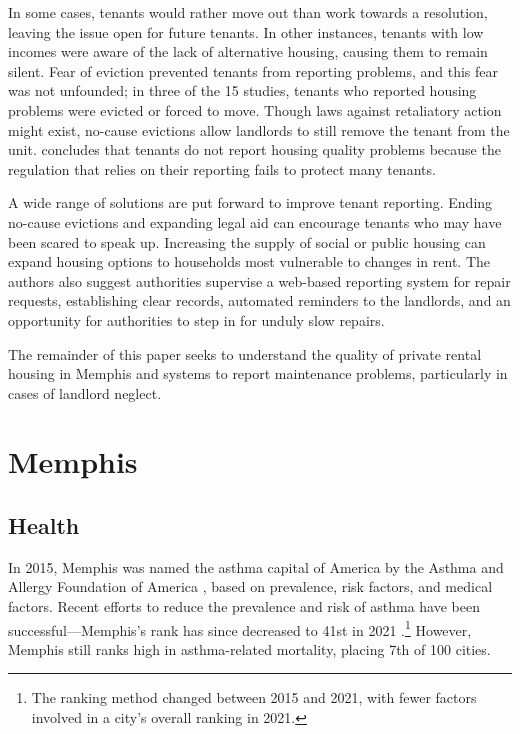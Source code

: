 \documentclass[
]{book}
\begin{document}
In some cases, tenants would rather move out than work towards a resolution, leaving the issue open for future tenants. In other instances, tenants with low incomes were aware of the lack of alternative housing, causing them to remain silent. Fear of eviction prevented tenants from reporting problems, and this fear was not unfounded; in three of the 15 studies, tenants who reported housing problems were evicted or forced to move. Though laws against retaliatory action might exist, no-cause evictions allow landlords to still remove the tenant from the unit. \citet{chisholm2018} concludes that tenants do not report housing quality problems because the regulation that relies on their reporting fails to protect many tenants.

A wide range of solutions are put forward to improve tenant reporting. Ending no-cause evictions and expanding legal aid can encourage tenants who may have been scared to speak up. Increasing the supply of social or public housing can expand housing options to households most vulnerable to changes in rent. The authors also suggest authorities supervise a web-based reporting system for repair requests, establishing clear records, automated reminders to the landlords, and an opportunity for authorities to step in for unduly slow repairs.

The remainder of this paper seeks to understand the quality of private rental housing in Memphis and systems to report maintenance problems, particularly in cases of landlord neglect.

\hypertarget{memphis}{%
\chapter{Memphis}\label{memphis}}

\hypertarget{health}{%
\section{Health}\label{health}}

In 2015, Memphis was named the asthma capital of America by the Asthma and Allergy Foundation of America \citep{aafa2015}, based on prevalence, risk factors, and medical factors. Recent efforts to reduce the prevalence and risk of asthma have been successful---Memphis's rank has since decreased to 41st in 2021 \citep{aafa2021}.\footnote{The ranking method changed between 2015 and 2021, with fewer factors involved in a city's overall ranking in 2021.} However, Memphis still ranks high in asthma-related mortality, placing 7th of 100 cities.
\end{document}
